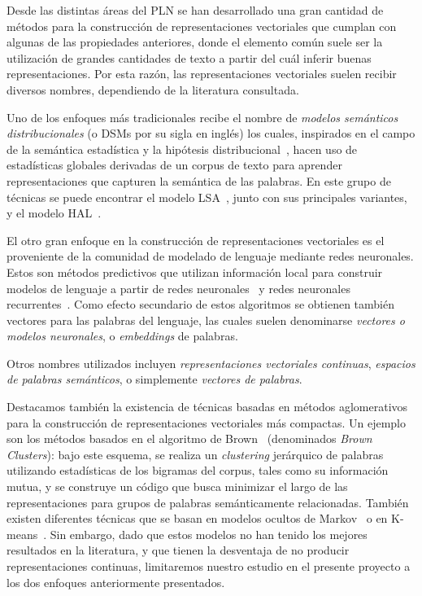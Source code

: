 Desde las distintas áreas del PLN se han desarrollado una gran cantidad de métodos para la
construcción de representaciones vectoriales que cumplan con algunas de las propiedades anteriores,
donde el elemento común suele ser la utilización de grandes cantidades de texto a partir del cuál
inferir buenas representaciones. Por esta razón, las representaciones vectoriales suelen recibir
diversos nombres, dependiendo de la literatura consultada.

Uno de los enfoques más tradicionales recibe el nombre de \textit{modelos semánticos
distribucionales} (o DSMs por su sigla en inglés) los cuales, inspirados en el campo de la semántica
estadística y la hipótesis distribucional~\cite{Harris1954}, hacen uso de estadísticas globales
derivadas de un corpus de texto para aprender representaciones que capturen la semántica de las
palabras. En este grupo de técnicas se puede encontrar el modelo LSA~\cite{Dumais1988,
Deerwester1990}, junto con sus principales variantes, y el modelo HAL~\cite{Lund1995,
LundBurgess1996}.

El otro gran enfoque en la construcción de representaciones vectoriales es el proveniente de la
comunidad de modelado de lenguaje mediante redes neuronales. Estos son métodos predictivos que
utilizan información local para construir modelos de lenguaje a partir de redes
neuronales~\cite{Bengio2003} y redes neuronales recurrentes~\cite{Mikolov2010}. Como efecto
secundario de estos algoritmos se obtienen también vectores para las palabras del lenguaje, las
cuales suelen denominarse \textit{vectores o modelos neuronales}, o \textit{embeddings} de palabras.

Otros nombres utilizados incluyen \textit{representaciones vectoriales continuas}, \textit{espacios
de palabras semánticos}, o simplemente \textit{vectores de palabras}.

Destacamos también la existencia de técnicas basadas en métodos aglomerativos para la construcción
de representaciones vectoriales más compactas. Un ejemplo son los métodos basados en el algoritmo de
Brown~\cite{Brown1992} (denominados \textit{Brown Clusters}): bajo este esquema, se realiza un
\textit{clustering} jerárquico de palabras utilizando estadísticas de los bigramas del corpus, tales
como su información mutua, y se construye un código que busca minimizar el largo de las
representaciones para grupos de palabras semánticamente relacionadas. También existen diferentes
técnicas que se basan en modelos ocultos de Markov~\cite{LiMcCallum2005} o en
K-means~\cite{LinWu2009}. Sin embargo, dado que estos modelos no han tenido los mejores resultados
en la literatura, y que tienen la desventaja de no producir representaciones continuas, limitaremos
nuestro estudio en el presente proyecto a los dos enfoques anteriormente presentados.


